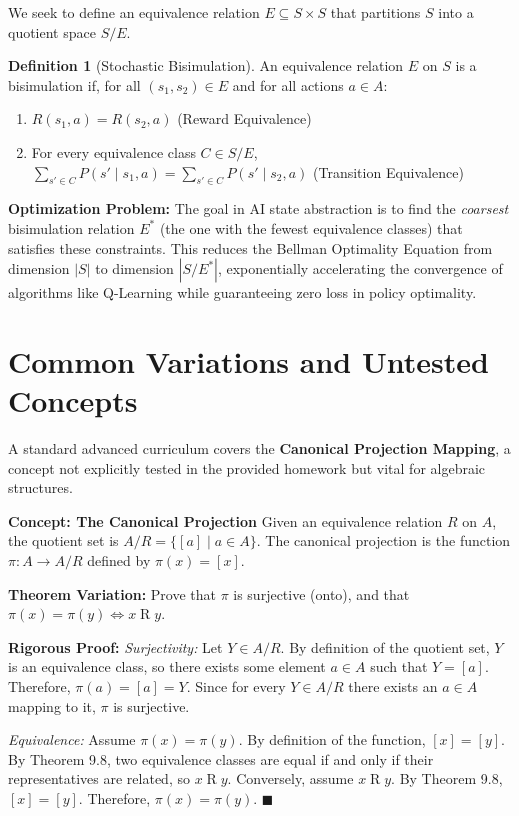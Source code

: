 \documentclass[11pt, a4paper]{article}
\theoremstyle{definition}
\newtheorem{definition}{Definition}[section]
\theoremstyle{remark}
\begin{document}
We seek to define an equivalence relation $E \subseteq S \times S$ that partitions $S$ into a quotient space $S/E$. 
\begin{definition}[Stochastic Bisimulation]
An equivalence relation $E$ on $S$ is a bisimulation if, for all $(s_1, s_2) \in E$ and for all actions $a \in A$:
\begin{enumerate}
    \item $R(s_1, a) = R(s_2, a)$ (Reward Equivalence)
    \item For every equivalence class $C \in S/E$, $\sum_{s' \in C} P(s' \mid s_1, a) = \sum_{s' \in C} P(s' \mid s_2, a)$ (Transition Equivalence)
\end{enumerate}
\end{definition}
\textbf{Optimization Problem:} The goal in AI state abstraction is to find the \textit{coarsest} bisimulation relation $E^*$ (the one with the fewest equivalence classes) that satisfies these constraints. This reduces the Bellman Optimality Equation from dimension $|S|$ to dimension $|S/E^*|$, exponentially accelerating the convergence of algorithms like Q-Learning while guaranteeing zero loss in policy optimality.

\newpage
\section{Common Variations and Untested Concepts}

A standard advanced curriculum covers the \textbf{Canonical Projection Mapping}, a concept not explicitly tested in the provided homework but vital for algebraic structures.

\textbf{Concept: The Canonical Projection}
Given an equivalence relation $R$ on $A$, the quotient set is $A/R = \{ [a] \mid a \in A \}$. The canonical projection is the function $\pi: A \to A/R$ defined by $\pi(x) = [x]$. 

\textbf{Theorem Variation:} Prove that $\pi$ is surjective (onto), and that $\pi(x) = \pi(y) \iff x \mathrel{R} y$.

\textbf{Rigorous Proof:}
\textit{Surjectivity:} Let $Y \in A/R$. By definition of the quotient set, $Y$ is an equivalence class, so there exists some element $a \in A$ such that $Y = [a]$. Therefore, $\pi(a) = [a] = Y$. Since for every $Y \in A/R$ there exists an $a \in A$ mapping to it, $\pi$ is surjective.

\textit{Equivalence:} 
Assume $\pi(x) = \pi(y)$. By definition of the function, $[x] = [y]$. By Theorem 9.8, two equivalence classes are equal if and only if their representatives are related, so $x \mathrel{R} y$. 
Conversely, assume $x \mathrel{R} y$. By Theorem 9.8, $[x] = [y]$. Therefore, $\pi(x) = \pi(y)$.
$\blacksquare$
\end{document}

